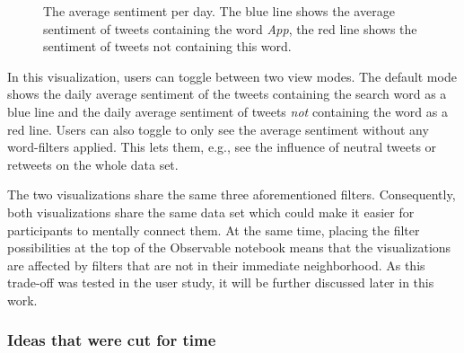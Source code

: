 \begin{figure}[h!tb]
    \caption{The average sentiment per day. The blue line shows the average sentiment of tweets containing the word \emph{App}, the red line shows the sentiment of tweets not containing this word.}
    \label{fig:sentiment_linechart}
\end{figure}

In this visualization, users can toggle between two view modes. The default mode shows the daily average sentiment of the tweets containing the search word as a blue line and the daily average sentiment of tweets \emph{not} containing the word as a red line. Users can also toggle to only see the average sentiment without any word-filters applied. This lets them, e.g., see the influence of neutral tweets or retweets on the whole data set.

The two visualizations share the same three aforementioned filters. Consequently, both visualizations share the same data set which could make it easier for participants to mentally connect them. At the same time, placing the filter possibilities at the top of the Observable notebook means that the visualizations are affected by filters that are not in their immediate neighborhood. As this trade-off was tested in the user study, it will be further discussed later in this work.

\subsubsection{Ideas that were cut for time}\label{sec:cutForTime}


